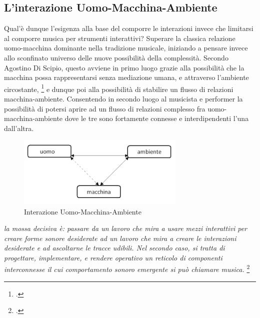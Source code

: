 \subsection{L'interazione Uomo-Macchina-Ambiente}
\label{sec:L'interazione Uomo-Macchina-Ambiente}

Qual'è dunque l'esigenza alla base del comporre le interazioni invece 
che limitarsi al comporre musica per strumenti interattivi? 
Superare la classica relazione uomo-macchina dominante nella tradizione musicale, 
iniziando a pensare invece allo sconfinato universo delle nuove possibilità della complessità.
Secondo Agostino Di Scipio, questo avviene in primo luogo grazie 
alla possibilità che la macchina possa rappresentarsi
senza mediazione umana, e attraverso l'ambiente circostante, \footcite{discipio_polverisonore_2016}
e dunque poi alla possibilità di stabilire un flusso di relazioni macchina-ambiente. 
Consentendo in secondo luogo al musicista e performer 
la possibilità di potersi aprire ad un flusso di relazioni 
complesso fra uomo-macchina-ambiente dove le tre sono fortamente connesse e interdipendenti 
l'una dall'altra.

\begin{figure}[h!]
\begin{center}
\vspace{0.5cm}
\includegraphics[width=8cm]{figures/uomo_macchina_ambiente.png} 
    \caption{Interazione Uomo-Macchina-Ambiente}
    \vspace{0.5cm}
\end{center}
\end{figure} 

\begin{center}
\vspace{0.5cm}
\textit{la mossa decisiva è: passare da un lavoro che mira a usare mezzi interattivi per creare forme sonore desiderate ad
un lavoro che mira a creare le interazioni desiderate e ad ascoltarne le tracce udibili. Nel secondo caso, si tratta
di progettare, implementare, e rendere operativo un reticolo di componenti interconnesse il cui comportamento
sonoro emergente si può chiamare musica.} \footcite{discipio_polverisonore_2016}
\vspace{0.5cm}
\end{center}

